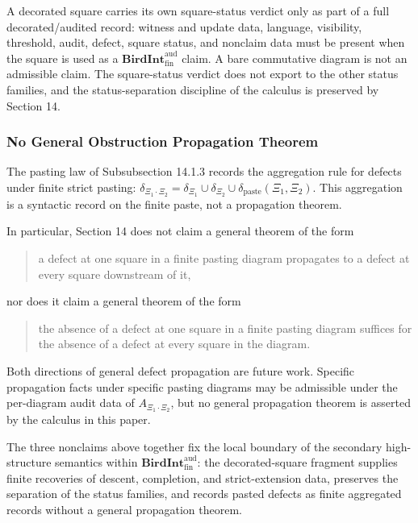 \documentclass[11pt]{article}
\theoremstyle{definition}
\begin{document}
A decorated square carries its own square-status verdict only as part of a full decorated/audited record: witness and update data, language, visibility, threshold, audit, defect, square status, and nonclaim data must be present when the square is used as a \(\mathbf{BirdInt}^{\mathrm{aud}}_{\mathrm{fin}}\) claim. A bare commutative diagram is not an admissible claim. The square-status verdict does not export to the other status families, and the status-separation discipline of the calculus is preserved by Section 14.

\subsubsection{No General Obstruction Propagation Theorem}

The pasting law of Subsubsection 14.1.3 records the aggregation rule for defects under finite strict pasting: \(\delta_{\Xi_{1}\cdot\Xi_{2}}=\delta_{\Xi_{1}}\cup\delta_{\Xi_{2}}\cup\delta_{\mathrm{paste}}(\Xi_{1},\Xi_{2})\). This aggregation is a syntactic record on the finite paste, not a propagation theorem.

In particular, Section 14 does not claim a general theorem of the form

\begin{quote}
a defect at one square in a finite pasting diagram propagates to a defect at every square downstream of it,
\end{quote}

nor does it claim a general theorem of the form

\begin{quote}
the absence of a defect at one square in a finite pasting diagram suffices for the absence of a defect at every square in the diagram.
\end{quote}

Both directions of general defect propagation are future work. Specific propagation facts under specific pasting diagrams may be admissible under the per-diagram audit data of \(A_{\Xi_{1}\cdot\Xi_{2}}\), but no general propagation theorem is asserted by the calculus in this paper.

The three nonclaims above together fix the local boundary of the secondary high-structure semantics within \(\mathbf{BirdInt}^{\mathrm{aud}}_{\mathrm{fin}}\): the decorated-square fragment supplies finite recoveries of descent, completion, and strict-extension data, preserves the separation of the status families, and records pasted defects as finite aggregated records without a general propagation theorem.
\end{document}
